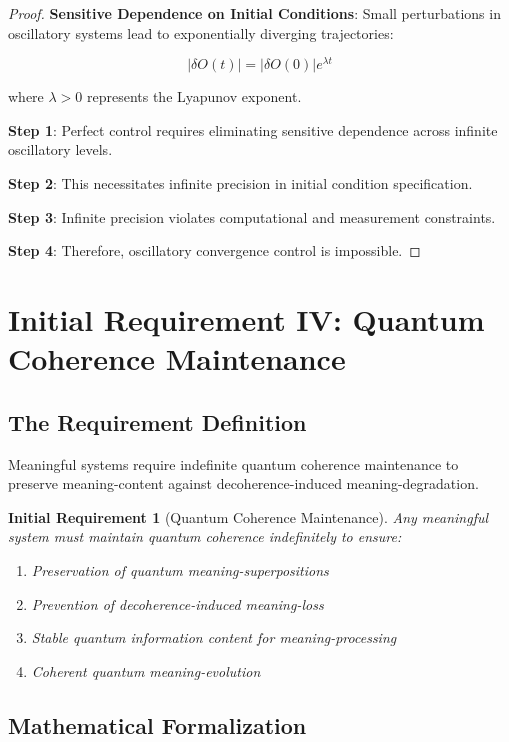 \documentclass[12pt,a4paper]{article}
\newtheorem{requirement}[theorem]{Initial Requirement}
\begin{document}
\begin{proof}
\textbf{Sensitive Dependence on Initial Conditions}: Small perturbations in oscillatory systems lead to exponentially diverging trajectories:

$$|\delta O(t)| = |\delta O(0)| e^{\lambda t}$$

where $\lambda > 0$ represents the Lyapunov exponent.

\textbf{Step 1}: Perfect control requires eliminating sensitive dependence across infinite oscillatory levels.

\textbf{Step 2}: This necessitates infinite precision in initial condition specification.

\textbf{Step 3}: Infinite precision violates computational and measurement constraints.

\textbf{Step 4}: Therefore, oscillatory convergence control is impossible.
\end{proof}

\section{Initial Requirement IV: Quantum Coherence Maintenance}

\subsection{The Requirement Definition}

Meaningful systems require indefinite quantum coherence maintenance to preserve meaning-content against decoherence-induced meaning-degradation.

\begin{requirement}[Quantum Coherence Maintenance]
Any meaningful system must maintain quantum coherence indefinitely to ensure:
\begin{enumerate}
\item Preservation of quantum meaning-superpositions
\item Prevention of decoherence-induced meaning-loss
\item Stable quantum information content for meaning-processing
\item Coherent quantum meaning-evolution
\end{enumerate}
\end{requirement}

\subsection{Mathematical Formalization}
\end{document}
